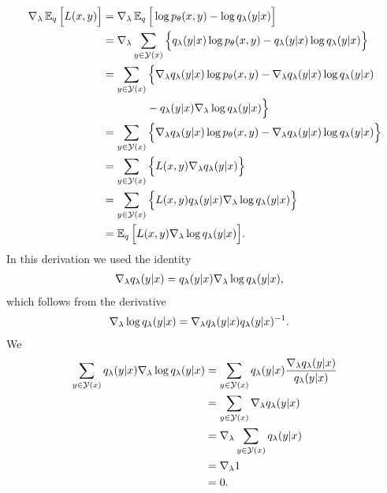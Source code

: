 \begin{align*}
  \nabla_{\lambda} \operatorname{\mathbb{E}}_{q} \Big[ L(x, y) \Big] &=
  \nabla_{\lambda} \operatorname{\mathbb{E}}_{q} \Big[ \log p_{\theta}(x, y) - \log q_{\lambda}(y | x) \Big] \\
    &= \nabla_{\lambda} \sum_{y \in \mathcal{Y}(x)} \Big\{ q_{\lambda}(y | x) \log p_{\theta}(x, y) - q_{\lambda}(y | x)\log q_{\lambda}(y | x) \Big\} \\
    &= \sum_{y \in \mathcal{Y}(x)} \Big\{ \nabla_{\lambda} q_{\lambda}(y | x) \log p_{\theta}(x, y)  - \nabla_{\lambda} q_{\lambda}(y | x)\log q_{\lambda}(y | x) \\
    &\qquad\qquad -  q_{\lambda}(y | x)\nabla_{\lambda}\log q_{\lambda}(y | x) \Big\} \\
    &= \sum_{y \in \mathcal{Y}(x)} \Big\{ \nabla_{\lambda} q_{\lambda}(y | x) \log p_{\theta}(x, y) - \nabla_{\lambda} q_{\lambda}(y | x)\log q_{\lambda}(y | x) \Big\} \\
    &= \sum_{y \in \mathcal{Y}(x)} \Big\{ L(x, y)\nabla_{\lambda} q_{\lambda}(y | x) \Big\} \\
    &= \sum_{y \in \mathcal{Y}(x)} \Big\{ L(x, y) q_{\lambda}(y | x) \nabla_{\lambda} \log q_{\lambda}(y | x) \Big\}   \\
    &= \operatorname{\mathbb{E}}_{q} \Big[ L(x, y) \nabla_{\lambda} \log q_{\lambda}(y | x) \Big].
\end{align*}
In this derivation we used the identity
\begin{align*}
  \nabla_{\lambda} q_{\lambda}(y | x) &= q_{\lambda}(y | x)\nabla_{\lambda}\log q_{\lambda}(y | x),
\end{align*}
which follows from the derivative
\begin{align*}
  \nabla_{\lambda}\log q_{\lambda}(y | x) &= \nabla_{\lambda} q_{\lambda}(y | x)q_{\lambda}(y | x)^{-1}.
\end{align*}
We
\begin{align*}
  \sum_{y \in \mathcal{Y}(x)} q_{\lambda}(y | x)\nabla_{\lambda}\log q_{\lambda}(y | x)
    &= \sum_{y \in \mathcal{Y}(x)}  q_{\lambda}(y | x) \frac{\nabla_{\lambda} q_{\lambda}(y | x)}{q_{\lambda}(y | x)}  \\
    &= \sum_{y \in \mathcal{Y}(x)} \nabla_{\lambda} q_{\lambda}(y | x) \\
    &= \nabla_{\lambda} \sum_{y \in \mathcal{Y}(x)} q_{\lambda}(y | x)\\
    &= \nabla_{\lambda} 1 \\
    &= 0. \\
\end{align*}


